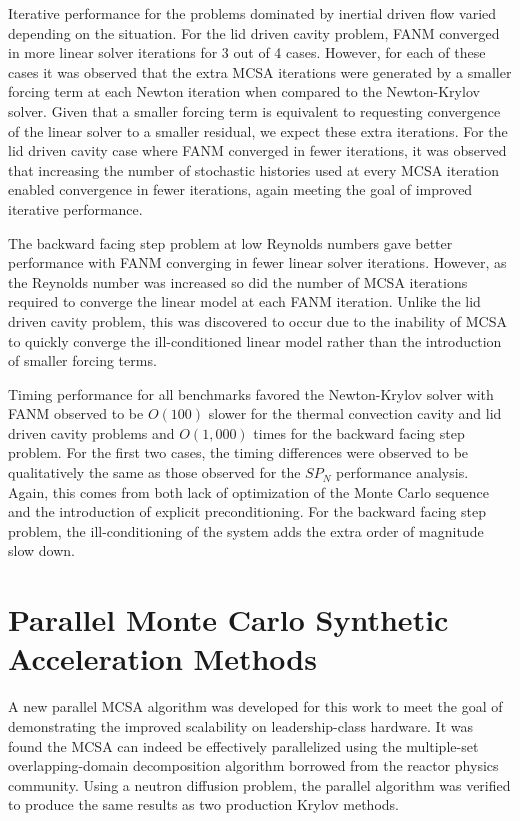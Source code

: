 Iterative performance for the problems dominated by inertial driven
flow varied depending on the situation. For the lid driven cavity
problem, FANM converged in more linear solver iterations for 3 out of
4 cases. However, for each of these cases it was observed that the
extra MCSA iterations were generated by a smaller forcing term at each
Newton iteration when compared to the Newton-Krylov solver. Given that
a smaller forcing term is equivalent to requesting convergence of the
linear solver to a smaller residual, we expect these extra
iterations. For the lid driven cavity case where FANM converged in
fewer iterations, it was observed that increasing the number of
stochastic histories used at every MCSA iteration enabled convergence
in fewer iterations, again meeting the goal of improved iterative
performance.

The backward facing step problem at low Reynolds numbers gave better
performance with FANM converging in fewer linear solver
iterations. However, as the Reynolds number was increased so did the
number of MCSA iterations required to converge the linear model at
each FANM iteration. Unlike the lid driven cavity problem, this was
discovered to occur due to the inability of MCSA to quickly converge
the ill-conditioned linear model rather than the introduction of
smaller forcing terms.

Timing performance for all benchmarks favored the Newton-Krylov solver
with FANM observed to be $O(100)$ slower for the thermal convection
cavity and lid driven cavity problems and $O(1,000)$ times for the
backward facing step problem. For the first two cases, the timing
differences were observed to be qualitatively the same as those
observed for the $SP_N$ performance analysis. Again, this comes from
both lack of optimization of the Monte Carlo sequence and the
introduction of explicit preconditioning. For the backward facing step
problem, the ill-conditioning of the system adds the extra order of
magnitude slow down.

\section{Parallel Monte Carlo Synthetic Acceleration Methods\ }
\label{sec:parallel_mc_conclusions}
A new parallel MCSA algorithm was developed for this work to meet the
goal of demonstrating the improved scalability on leadership-class
hardware. It was found the MCSA can indeed be effectively parallelized
using the multiple-set overlapping-domain decomposition algorithm
borrowed from the reactor physics community. Using a neutron diffusion
problem, the parallel algorithm was verified to produce the same
results as two production Krylov methods.

